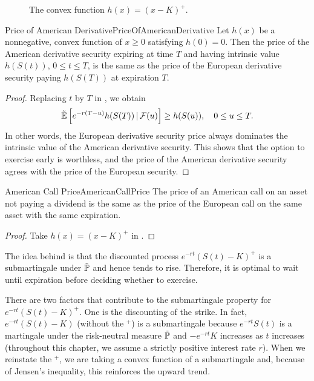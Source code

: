 \begin{figure}[H]
	\centering
	
	\caption{The convex function \(h(x) = (x-K)^+\).}\label{fig:ConvexFunctionPayoff}
\end{figure}

\begin{thm}{Price of American Derivative}{PriceOfAmericanDerivative}
	Let \(h(x)\) be a nonnegative, convex function of \(x \ge 0\) satisfying \(h(0) = 0\). Then the price of the American derivative security expiring at time \(T\) and having intrinsic value \(h(S(t))\), \(0 \le t \le T\), is the same as the price of the European derivative security paying \(h(S(T))\) at expiration \(T\).
\end{thm}

\begin{proof}
	Replacing \(t\) by \(T\) in , we obtain
	\[
		\tilde{\mathbb{E}}\left[e^{-r(T-u)}h(S(T)) \,\vert\, \mathcal{F}(u)\right] \ge h(S(u)), \quad 0 \le u \le T.
	\]
	In other words, the European derivative security price always dominates the intrinsic value of the American derivative security. This shows that the option to exercise early is worthless, and the price of the American derivative security agrees with the price of the European security.
\end{proof}

\begin{cor}{American Call Price}{AmericanCallPrice}
	The price of an American call on an asset not paying a dividend is the same as the price of the European call on the same asset with the same expiration.
\end{cor}

\begin{proof}
	Take \(h(x) = (x - K)^+\) in .
\end{proof}

The idea behind  is that the discounted process \(e^{-rt}(S(t) - K)^+\) is a submartingale under \(\tilde{\mathbb{P}}\) and hence tends to rise. Therefore, it is optimal to wait until expiration before deciding whether to exercise.

There are two factors that contribute to the submartingale property for \(e^{-rt}(S(t)-K)^+\). One is the discounting of the strike. In fact, \(e^{-rt}(S(t)-K)\) (without the \(^+\)) is a submartingale because \(e^{-rt}S(t)\) is a martingale under the risk-neutral measure \(\tilde{\mathbb{P}}\) and \(-e^{-rt}K\) increases as \(t\) increases (throughout this chapter, we assume a strictly positive interest rate \(r\)). When we reinstate the \(^+\), we are taking a convex function of a submartingale and, because of Jensen's inequality, this reinforces the upward trend.

